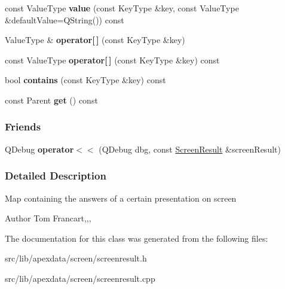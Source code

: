 \begin{DoxyCompactItemize}
\item
\hypertarget{classapex_1_1_screen_result_af232cd9b0e1bc21ddc088d5ee46b780a}{const Value\-Type {\bfseries value} (const Key\-Type \&key, const Value\-Type \&default\-Value=Q\-String()) const }\label{classapex_1_1_screen_result_af232cd9b0e1bc21ddc088d5ee46b780a}

\item
\hypertarget{classapex_1_1_screen_result_a9c0fe9e1cef6f753e002a5bc882ca059}{Value\-Type \& {\bfseries operator\mbox{[}$\,$\mbox{]}} (const Key\-Type \&key)}\label{classapex_1_1_screen_result_a9c0fe9e1cef6f753e002a5bc882ca059}

\item
\hypertarget{classapex_1_1_screen_result_a9d03acc9f0c004357dd8dc50356cd76a}{const Value\-Type {\bfseries operator\mbox{[}$\,$\mbox{]}} (const Key\-Type \&key) const }\label{classapex_1_1_screen_result_a9d03acc9f0c004357dd8dc50356cd76a}

\item
\hypertarget{classapex_1_1_screen_result_a7aa8db7e977edba9860de6d908d3b56b}{bool {\bfseries contains} (const Key\-Type \&key) const }\label{classapex_1_1_screen_result_a7aa8db7e977edba9860de6d908d3b56b}

\item
\hypertarget{classapex_1_1_screen_result_a9656cdfa79f577dced79a8ad63771609}{const Parent {\bfseries get} () const }\label{classapex_1_1_screen_result_a9656cdfa79f577dced79a8ad63771609}

\end{DoxyCompactItemize}
\subsubsection*{Friends}
\begin{DoxyCompactItemize}
\item
\hypertarget{classapex_1_1_screen_result_a55b613a5f2c2733c8485c4cd7ba037d9}{Q\-Debug {\bfseries operator$<$$<$} (Q\-Debug dbg, const \hyperlink{classapex_1_1_screen_result}{Screen\-Result} \&screen\-Result)}\label{classapex_1_1_screen_result_a55b613a5f2c2733c8485c4cd7ba037d9}

\end{DoxyCompactItemize}


\subsubsection{Detailed Description}
Map containing the answers of a certain presentation on screen

\begin{DoxyAuthor}{Author}
Tom Francart,,,
\end{DoxyAuthor}


The documentation for this class was generated from the following files\-:\begin{DoxyCompactItemize}
\item
src/lib/apexdata/screen/screenresult.\-h\item
src/lib/apexdata/screen/screenresult.\-cpp\end{DoxyCompactItemize}
